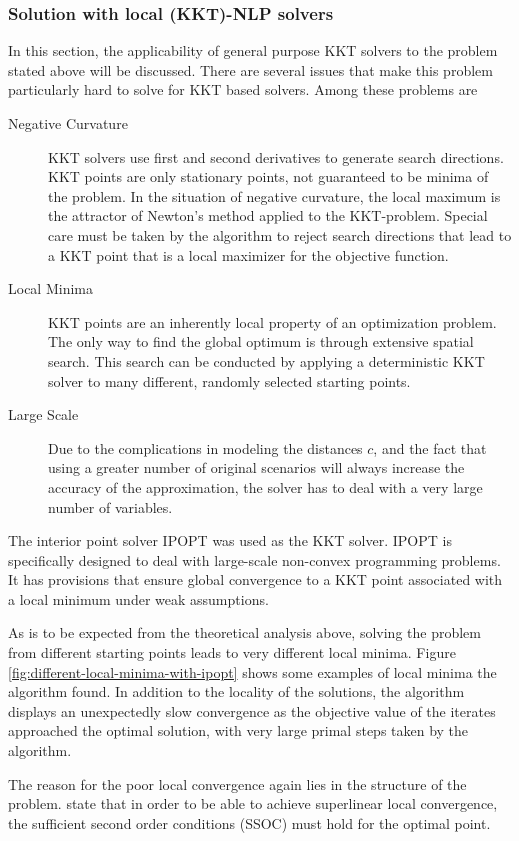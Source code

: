 \subsubsection{Solution with local (KKT)-NLP solvers}
In this section, the applicability of general purpose KKT solvers to the problem stated above will be discussed. There are several issues that make this problem particularly hard to solve for KKT based solvers. Among these problems are
\begin{description}
\item[Negative Curvature] KKT solvers use first and second derivatives to generate search directions. KKT points are only stationary points, not guaranteed to be minima of the problem. In the situation of negative curvature, the local maximum is the attractor of Newton's method applied to the KKT-problem. Special care must be taken by the algorithm to reject search directions that lead to a KKT point that is a local maximizer for the objective function.
\item[Local Minima] KKT points are an inherently local property of an optimization problem. The only way to find the global optimum is through extensive spatial search. This search can be conducted by applying a deterministic KKT solver to many different, randomly selected starting points.
\item[Large Scale] Due to the complications in modeling the distances $c$, and the fact that using a greater number of original scenarios will always increase the accuracy of the approximation, the solver has to deal with a very large number of variables.
\end{description}
The interior point solver IPOPT \citep{IpoptImplementation2006} was used as the KKT solver. IPOPT is specifically designed to deal with large-scale non-convex programming problems. It has provisions that ensure global convergence to a KKT point associated with a local minimum under weak assumptions.

As is to be expected from the theoretical analysis above, solving the problem from different starting points leads to very different local minima. Figure \ref{fig:different-local-minima-with-ipopt} shows some examples of local minima the algorithm found. In addition to the locality of the solutions, the algorithm displays an unexpectedly slow convergence as the objective value of the iterates approached the optimal solution, with very large primal steps taken by the algorithm.

The reason for the poor local convergence again lies in the structure of the problem. \citet{Waechter2005} state that in order to be able to achieve superlinear local convergence, the sufficient second order conditions (SSOC) must hold for the optimal point.

